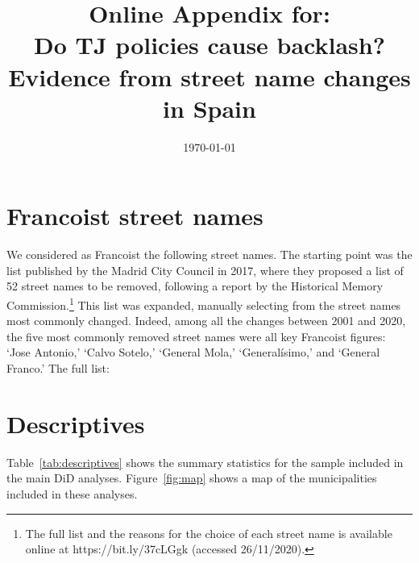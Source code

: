 \documentclass[12pt, titlepage]{article}
\title{\Large Online Appendix for:\\Do TJ policies cause backlash?\\Evidence from street name changes in Spain}
\author{}
\date{\today}
\begin{document}
\maketitle

\tableofcontents


\clearpage
\section{Francoist street names}\label{app:franc_names_list}

We considered as Francoist the following street names. The starting point was the list published by the Madrid City Council in 2017, where they proposed a list of 52 street names to be removed, following a report by the Historical Memory Commission.\footnote{The full list and the reasons for the choice of each street name is available online at https://bit.ly/37cLGgk (accessed 26/11/2020).}
This list was expanded, manually selecting from the street names most commonly changed.
Indeed, among all the changes between 2001 and 2020, the five most commonly removed street names were all key Francoist figures: `Jose Antonio,' `Calvo Sotelo,' `General Mola,' `Generalísimo,' and `General Franco.' The full list:

\begin{quote}
  
\end{quote}

\clearpage
\section{Descriptives}\label{app:descriptives}

Table~\ref{tab:descriptives} shows the summary statistics for the sample included in the main DiD analyses. Figure~\ref{fig:map} shows a map of the municipalities included in these analyses.


\end{document}
